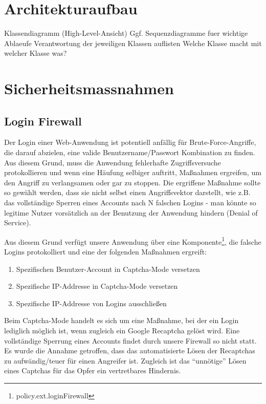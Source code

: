 \documentclass[12pt,DIV14,BCOR10mm,a4paper,twoside,parskip=half-,headsepline,headinclude,english,ngerman,bibliography=totocnumbered]{scrreprt}
\begin{document}
\tableofcontents  %

\chapter{Architekturaufbau}

Klassendiagramm (High-Level-Ansicht)
Ggf. Sequenzdiagramme fuer wichtige Ablaeufe
Verantwortung der jeweiligen Klassen auflisten
Welche Klasse macht mit welcher Klasse was?

\chapter{Sicherheitsmassnahmen}

\section{Login Firewall}
Der Login einer Web-Anwendung ist potentiell anfällig für Brute-Force-Angriffe, die darauf abzielen, eine valide Benutzername/Passwort Kombination zu finden. Aus diesem Grund, muss die Anwendung fehlerhafte Zugriffsversuche protokollieren und wenn eine Häufung selbiger auftritt, Maßnahmen ergreifen, um den Angriff zu verlangsamen oder gar zu stoppen. Die ergriffene Maßnahme sollte so gewählt werden, dass sie nicht selbst einen Angriffsvektor darstellt, wie z.B. das vollständige Sperren eines Accounts nach N falschen Logins - man könnte so legitime Nutzer vorsätzlich an der Benutzung der Anwendung hindern (Denial of Service).

Aus diesem Grund verfügt unsere Anwendung über eine Komponente\footnote{policy.ext.loginFirewall}, die falsche Logins protokolliert und eine der folgenden Maßnahmen ergreift:

\begin{enumerate}
\item Spezifischen Benutzer-Account in Captcha-Mode versetzen
\item Spezifische IP-Addresse in Captcha-Mode versetzen
\item Spezifische IP-Addresse von Logins ausschließen
\end{enumerate}

Beim Captcha-Mode handelt es sich um eine Maßnahme, bei der ein Login lediglich möglich ist, wenn zugleich ein Google Recaptcha gelöst wird. Eine vollständige Sperrung eines Accounts findet durch unsere Firewall so nicht statt. Es wurde die Annahme getroffen, dass das automatisierte Lösen der Recaptchas zu aufwändig/teuer für einen Angreifer ist. Zugleich ist das ``unnötige'' Lösen eines Captchas für das Opfer ein vertretbares Hindernis.
\end{document}
